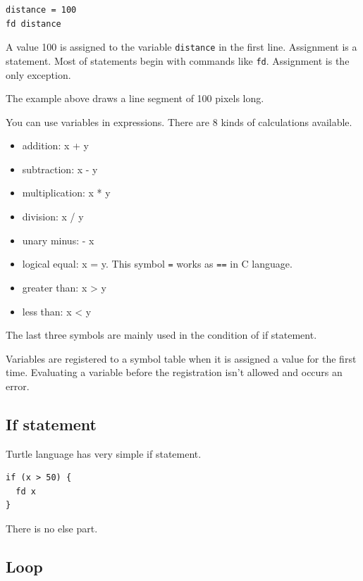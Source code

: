 \begin{lstlisting}
distance = 100
fd distance
\end{lstlisting}

A value 100 is assigned to the variable
\passthrough{\lstinline!distance!} in the first line. Assignment is a
statement. Most of statements begin with commands like
\passthrough{\lstinline!fd!}. Assignment is the only exception.

The example above draws a line segment of 100 pixels long.

You can use variables in expressions. There are 8 kinds of calculations
available.

\begin{itemize}
\tightlist
\item
  addition: x + y
\item
  subtraction: x - y
\item
  multiplication: x * y
\item
  division: x / y
\item
  unary minus: - x
\item
  logical equal: x = y. This symbol \passthrough{\lstinline!=!} works as
  \passthrough{\lstinline!==!} in C language.
\item
  greater than: x \textgreater{} y
\item
  less than: x \textless{} y
\end{itemize}

The last three symbols are mainly used in the condition of if statement.

Variables are registered to a symbol table when it is assigned a value
for the first time. Evaluating a variable before the registration isn't
allowed and occurs an error.

\subsection{If statement}\label{if-statement}

Turtle language has very simple if statement.

\begin{lstlisting}
if (x > 50) {
  fd x
}
\end{lstlisting}

There is no else part.

\subsection{Loop}\label{loop}

